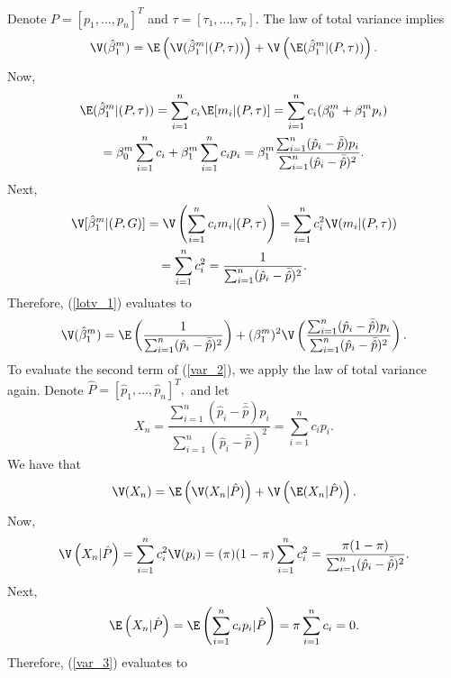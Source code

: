 \documentclass[12pt]{article}
\begin{document}
Denote $P = [p_1, \dots, p_n ]^T$ and $\tau = [\tau_1, \dots, \tau_n]$. The law of total variance implies
\begin{equation}\label{lotv_1}
\V( \hat{\beta}^m_1 )  = \E \left( \V ( \hat{\beta}^m_1 | (P, \tau) ) \right) + \V \left(\E(\hat{\beta}^m_1 | (P, \tau))\right) .
\end{equation}
Now,
\begin{multline}\label{exp_1}
\E(\hat{\beta}^m_1 |(P, \tau)) = \sum_{i=1}^n c_i \E[m_i | (P,\tau)] =\sum_{i=1}^n c_i (\beta^m_0 + \beta^m_1 p_i) \\ = \beta^m_0 \sum_{i=1}^n c_i + \beta^m_1 \sum_{i=1}^n c_i p_i = \beta^m_1 \frac{ \sum_{i=1}^n (\hat{p}_i - \bar{\hat{p}} ) p_i}{ \sum_{i=1}^n (\hat{p}_i - \bar{\hat{p}})^2}.
\end{multline}
Next,
\begin{multline}\label{var_1}
\V[\hat{\beta}^m_1 | (P, G)] = \V\left( \sum_{i=1}^n c_i m_i | (P, \tau) \right) = \sum_{i=1}^n c_i^2 \V(m_i | (P, \tau)) \\ = \sum_{i=1}^n c^2_i = \frac{ 1 }{ \sum_{i=1}^n (\hat{p}_i - \bar{\hat{p}})^2}.\end{multline}
Therefore, (\ref{lotv_1}) evaluates to
\begin{equation}\label{var_2}
 \V(\hat{\beta}^m_1) = \E\left( \frac{ 1 }{ \sum_{i=1}^n (\hat{p}_i - \bar{\hat{p}})^2} \right) + (\beta^m_1)^2 \V \left( \frac{ \sum_{i=1}^n (\hat{p}_i - \bar{\hat{p}} ) p_i}{ \sum_{i=1}^n (\hat{p}_i - \bar{\hat{p}})^2}\right).
 \end{equation}
To evaluate the second term of (\ref{var_2}), we apply the law of total variance again. Denote $\hat{P} = [\hat{p}_1, \dots, \hat{p}_n]^T,$ and let
$$ X_n = \frac{ \sum_{i=1}^n (\hat{p}_i - \bar{\hat{p}} ) p_i}{ \sum_{i=1}^n (\hat{p}_i - \bar{\hat{p}})^2} = \sum_{i=1}^n c_i p_i.$$ We have that 
\begin{equation}\label{var_3}
\V(X_n)  = \E \left(\V( X_n | \hat{P} )\right) + \V \left( \E (X_n | \hat{P})\right).
\end{equation} Now,
$$\V \left( X_n | \hat{P} \right) = \sum_{i=1}^n c_i^2 \V(p_i) = (\pi)(1-\pi) \sum_{i=1}^n c_i^2 = \frac{ \pi(1-\pi) }{ \sum_{i=1}^n ( \hat{p}_i - \bar{ \hat{p}})^2}.$$
Next,
$$ \E \left( X_n | \hat{P} \right) = \E\left( \sum_{i=1}^n c_i p_i | \hat{P} \right) = \pi \sum_{i=1}^n c_i = 0.$$
Therefore, (\ref{var_3}) evaluates to
\end{document}
